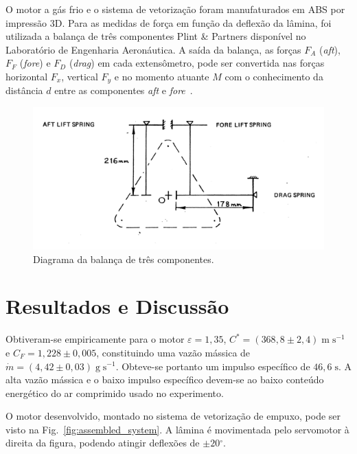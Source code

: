 \documentclass[
	article,			%
	10pt,				%
	oneside,			%
	a4paper,			%
  twocolumn,			%
	english,			%
	brazil,				%
	sumario=tradicional,
	]{abntex2}
\begin{document}
O motor a gás frio e o sistema de vetorização foram manufaturados em ABS por impressão 3D. Para as medidas de força em função da deflexão da lâmina, foi utilizada a balança de três componentes Plint \& Partners disponível no Laboratório de Engenharia Aeronáutica. A saída da balança, as forças \(F_A\) (\textit{aft}), \(F_F\) (\textit{fore}) e \(F_D\) (\textit{drag}) em cada extensômetro, pode ser convertida nas forças horizontal \(F_x\), vertical \(F_y\) e no momento atuante \(M\) com o conhecimento da distância \(d\) entre as componentes \textit{aft} e \textit{fore}~\cite{lab}.

\begin{figure}[htbp]
  \centering
  \includegraphics[width=\linewidth]{../report/img/three_axis_scale_diagram.png}
  \caption{Diagrama da balança de três componentes.}\label{fig:diag_three_axis_scale}
\end{figure}

\section{Resultados e Discussão}

Obtiveram-se empiricamente para o motor \(\varepsilon = 1,35\), \(C^* = (368,8 \pm 2,4)\;\mathrm{m}\;\mathrm{s}^{-1}\) e \(C_{F} = 1,228 \pm 0,005\), constituindo uma vazão mássica de \(\dot{m} = (4,42 \pm 0,03)\;\mathrm{g}\;\mathrm{s}^{-1}\). Obteve-se portanto um impulso específico de \(46,6\;\mathrm{s}\). A alta vazão mássica e o baixo impulso específico devem-se ao baixo conteúdo energético do ar comprimido usado no experimento. 

O motor desenvolvido, montado no sistema de vetorização de empuxo, pode ser visto na Fig.~\ref{fig:assembled_system}. A lâmina é movimentada pelo servomotor à direita da figura, podendo atingir deflexões de \(\pm 20\mathrm{^\circ}\). 
\end{document}
